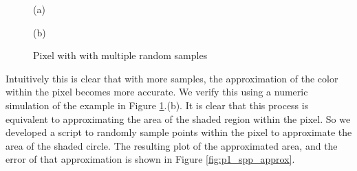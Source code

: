 \documentclass[../pbr.tex]{subfile}
\begin{document}
\begin{figure}[htpb]
  \begin{center}
    \begin{minipage}{0.45\textwidth}
      \begin{center}

        (a)
      \end{center}
    \end{minipage}
    \begin{minipage}{0.45\textwidth}
      \begin{center}

        (b)
      \end{center}
    \end{minipage}
  \end{center}
  \caption{Pixel with with multiple random samples}%
  \label{fig:p1_spp_pixel}
\end{figure}

Intuitively this is clear that with more samples, the approximation of the
color within the pixel becomes more accurate. We verify this using a numeric
simulation of the example in Figure \ref{fig:p1_spp_pixel}.(b). It is clear
that this process is equivalent to approximating the area of the shaded region
within the pixel. So we developed a script to randomly sample points within the
pixel to approximate the area of the shaded circle. The resulting plot of the
approximated area, and the error of that approximation is shown in Figure
\ref{fig:p1_spp_approx}.
\end{document}
